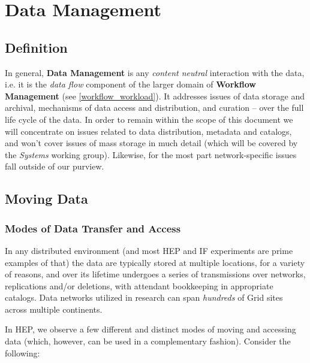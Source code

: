 \section{Data Management}
\label{data}


\subsection{Definition}
In general, \textbf{Data Management} is any \textit{content neutral} interaction with the data, i.e. it is the \textit{data flow}
component of the larger domain of  \textbf{Workflow Management} (see \ref{workflow_workload}). It addresses issues of data storage
and archival, mechanisms of data access and distribution, and  curation -- over the full life cycle of the data. In order to remain within
the scope of this document we will
concentrate on issues related to data distribution, metadata and catalogs, and won't cover issues of mass storage
in much detail (which will be covered by the \textit{Systems} working group). Likewise, for the most part network-specific issues fall outside of our purview.



\subsection{Moving Data}
\subsubsection{Modes of Data Transfer and Access}
In any distributed environment (and most HEP and IF experiments are prime examples of that) the data are typically stored at multiple locations,
for a variety of reasons, and over its lifetime undergoes a series of transmissions over networks, replications and/or deletions, with attendant bookkeeping
in appropriate catalogs. Data networks utilized in research can span \textit{hundreds} of Grid sites across multiple continents.

In HEP, we observe a few different and distinct modes of moving and accessing data (which, however, can be used in a complementary fashion).
Consider the following:

